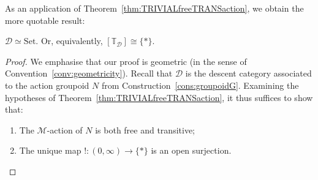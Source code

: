 \documentclass[a4paper, 11pt,reqno]{amsart}
\newcommand{\Set}{\mathrm{Set}}
\newcommand{\M}{\mathcal{M}}
\newcommand{\thT}{\mathbb{T}}
\newcommand{\D}{\mathcal{D}}
\begin{document}

As an application of Theorem~\ref{thm:TRIVIALfreeTRANSaction}, we obtain the more quotable result:

\begin{theorem}\label{thm:DESCENTsinglePRIME}  $\D\simeq \Set$. Or, equivalently, $[\thT_\D]\cong \{*\}$.
\end{theorem}


\begin{proof} We emphasise that our proof is geometric (in the sense of Convention~\ref{conv:geometricity}). Recall that $\D$ is the descent category associated to the action groupoid $N$ from Construction~\ref{cons:groupoidG}. Examining the hypotheses of Theorem~\ref{thm:TRIVIALfreeTRANSaction}, it thus suffices to show that:
	\begin{enumerate}[label=(\alph*)]
		\item The $\M$-action of $N$ is both free and transitive;
		\item The unique map $!\colon (0,\infty)\rightarrow \{*\}$ is an open surjection.
	\end{enumerate}


\end{proof}
\end{document}
